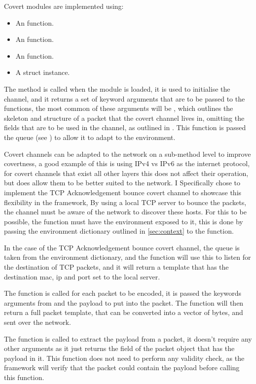 Covert modules are implemented using:
\begin{itemize}
    \item An  function.
    \item An  function.
    \item An  function.
    \item A  struct instance.
\end{itemize}

The  method is called when the module is loaded, it is used to initialise the channel, and it returns a set of keyword arguments that are to be passed to the  functions, the most common of these arguments will be , which outlines the skeleton and structure of a packet that the covert channel lives in, omitting the fields that are to be used in the channel, as outlined in . This function is passed the queue (see ) to allow it to adapt to the environment.

Covert channels can be adapted to the network on a sub-method level to improve covertness, a good example of this is using IPv4 vs IPv6 as the internet protocol, for covert channels that exist all other layers this does not affect their operation, but does allow them to be better suited to the network. I Specifically chose to implement the TCP Acknowledgement bounce covert channel to showcase this flexibility in the framework, By using a local TCP server to bounce the packets, the channel must be aware of the network to discover these hosts. For this to be possible, the  function must have the environment exposed to it, this is done by passing the environment dictionary outlined in \ref{sec:context} to the  function.

In the case of the TCP Acknowledgement bounce covert channel, the queue is taken from the environment dictionary, and the  function will use this to listen for the destination of TCP packets, and it will return a template that has the destination mac, ip and port set to the local server.

The  function is called for each packet to be encoded, it is passed the keywords arguments from  and the payload to put into the packet. The function will then return a full packet template, that can be converted into a vector of bytes, and sent over the network.

The  function is called to extract the payload from a packet, it doesn't require any other arguments as it just returns the field of the packet object that has the payload in it. This function does not need to perform any validity check, as the framework will verify that the packet could contain the payload before calling this function.

